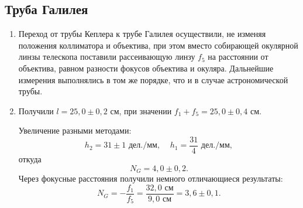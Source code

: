 \documentclass[a4paper, 12pt]{article}%
\begin{document}
	\subsection{Труба Галилея}
	\begin{enumerate}
	\item Переход от трубы Кеплера к трубе Галилея осуществили, не изменяя положения коллиматора и объектива, при этом вместо собирающей окулярной линзы телескопа поставили рассеивающую линзу $f_5$ на расстоянии от объектива, равном разности фокусов объектива и окуляра. Дальнейшие измерения выполнялись в том же порядке, что и в случае астрономической трубы.
	
	\item Получили $l = 25{,}0\pm0{,}2$ см, при значении $f_1 + f_5 = 25{,}0\pm0{,}4$ см. 
	
	Увеличение разными методами:
	\begin{equation*}
		h_2 = 31\pm1\text{ дел./мм},\;\;\;\; h_1 = \dfrac{31}{4}\text{ дел./мм},
	\end{equation*}
	откуда
	\begin{equation*}
	N_G = 4{,}0\pm0{,}2.
	\end{equation*}
	Через фокусные расстояния получили немного отличающиеся результаты:
	\begin{equation*}
		N_G = -\dfrac{f_1}{f_5} = \dfrac{32{,}0\text{ см}}{9{,}0\text{ см}} = 3{,}6\pm0{,}1.
	\end{equation*}
	
	\end{enumerate}
	
\end{document}

